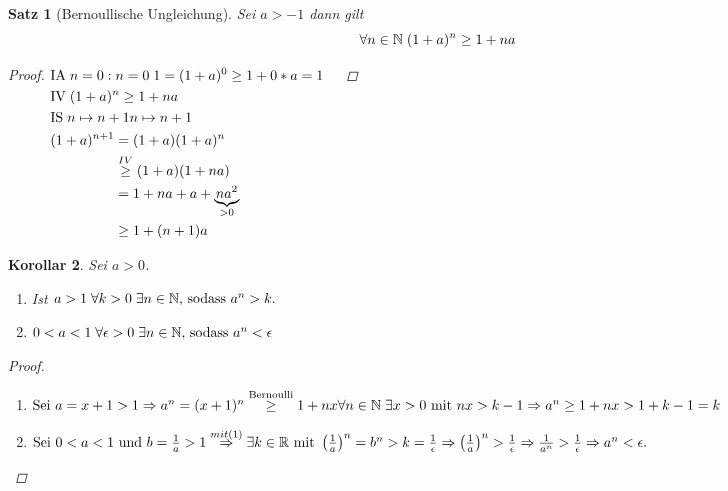 \documentclass[a4paper,titlepage,oneside]{article}
\def\N{\ensuremath{\mathbb{N}} }
\def\R{\ensuremath{\mathbb{R}} }
\newcommand{\IA}[1][n=0]{\vspace{0.1pt}\ensuremath{\text{IA}\sp#1:}}
\newcommand{\IV}{\vspace{0.1pt}\ensuremath{\text{IV}\sp}}
\newcommand{\IS}[1][n \mapsto n+1]{\vspace{0.1pt}\ensuremath{\text{IS}\sp#1}}
\def\fa{\ensuremath{\forall}}
\def\sp{\hspace{0,1cm}}
\theoremstyle{thmstyle}
\newtheorem{satz}{Satz}[subsection]
\newtheorem{korr}[satz]{Korollar}
\begin{document}
\begin{satz}[Bernoullische Ungleichung]
Sei \(a > -1\) dann gilt \[\fa n \in \N \sp (1+a)^n \ge 1 + na \]
\begin{proof}
\begin{math}
\begin{aligned}[t]
	&\IA{n=0} \sp 1 = (1 + a)^0 \ge 1 + 0*a = 1				&&\\
	&\IV (1+a)^n \ge 1 + na								&&\\
	&\IS{n \mapsto n+1} \\ 
	&\begin{aligned}[t]
		(1+a)^{n+1} 	&= (1+a)(1+a)^n 					&&\\
					&\overset{IV}{\ge} (1 + a)(1 + na) 		&&\\
					&= 1 + na + a + \underbrace{na^2}_{> 0} 	&&\\
					&\ge 1 + (n+1)a \end{aligned}
\end{aligned}
\end{math}
\newline
\end{proof}
\end{satz}
\newpage

\begin{korr}
Sei \(a > 0\).
\begin{enumerate}[label=(\arabic*)]
	\item Ist \sp \(a > 1 \sp \forall k > 0 \sp \exists n \in \N \text{, sodass }a^n > k.\)
	\item \(0 < a < 1 \sp \forall \epsilon > 0 \sp \exists n \in \N \text{, sodass }a^n < \epsilon\)
\end{enumerate}
\begin{proof}\sp
\begin{enumerate}[label=(\arabic*)]
	\item \begin{math}
		\text{Sei } a = x + 1 > 1 \Rightarrow a^n = (x + 1)^n \overset{\text{Bernoulli}}{\ge} 1 + nx \\
		\forall n \in \N \sp \exists x > 0 \text{ mit } nx > k - 1 \Rightarrow a^n \ge 1 + nx > 1 + k -1 = k 
		\end{math}
	\item \begin{math}
		\text{Sei } 0 < a < 1 \text{ und } b = \frac{1}{a} > 1 \overset{\tiny{mit (1)}}{\Rightarrow} \exists k \in \R \text{ mit }  \left(\frac{1}{a}\right)^n = b^n > k = \frac{1}{\epsilon}\\
		\Rightarrow  \left(\frac{1}{a}\right)^n > \frac{1}{\epsilon} \Rightarrow  \frac{1}{a^n} > \frac{1}{\epsilon} \Rightarrow a^n < \epsilon.
		\end{math}
\end{enumerate}
\end{proof}
\end{korr}
\end{document}

